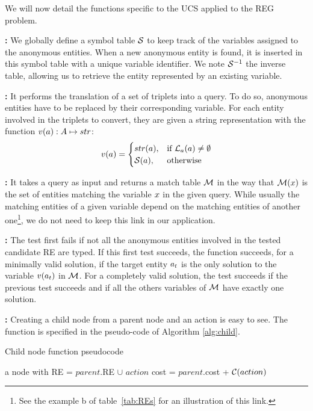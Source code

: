 We will now detail the functions specific to the UCS applied to the REG problem.

\textbf{\tovariable: }
We globally define a symbol table $\mathcal{S}$ to keep track of the variables assigned to the anonymous entities. When a new anonymous entity is found, it is inserted in this symbol table with a unique variable identifier. We note $\mathcal{S}^{-1}$ the inverse table, allowing us to retrieve the entity represented by an existing variable.

\textbf{\toquery: }
It performs the translation of a set of triplets into a \sparql{} query. To do so, anonymous entities have to be replaced by their corresponding variable. For each entity involved in the triplets to convert, they are given a string representation with the function $v(a): A \mapsto str$: 
\[ 
    v(a) = 
    \begin{cases}
        str(a),& \text{if } \mathcal{L}_a(a) \neq \emptyset\\
        \mathcal{S}(a),& \text{otherwise}
    \end{cases} 
\]

\textbf{\sparqlresult: }
It takes a \sparql{} query as input and returns a match table $\mathcal{M}$ in the way that $\mathcal{M}(x)$ is the set of entities matching the variable $x$ in the given query. While usually the matching entities of a given variable depend on the matching entities of another one\footnote{See the example b of table~\ref{tab:REs} for an illustration of this link.}, we do not need to keep this link in our application.

\textbf{\goaltest: }
The test first fails if not all the anonymous entities involved in the tested candidate RE are typed. If this first test succeeds, the function succeeds, for a minimally valid solution, if the target entity $a_t$ is the only solution to the variable $v(a_t)$ in $\mathcal{M}$. For a completely valid solution, the test succeeds if the previous test succeeds and if all the others variables of $\mathcal{M}$ have exactly one solution.

\textbf{\createchild: } 
Creating a child node from a parent node and an action is easy to see. The \createchild function is specified in the pseudo-code of Algorithm \ref{alg:child}. 

\begin{algorithm}[H]
\caption{\label{alg:child} Child node function pseudocode}
\begin{algorithmic}
    \State \Return a node with
    \State RE = $parent$.RE $\cup$ $action$
    \State cost = $parent$.cost + $\mathcal{C}(action)$
\EndFunction
\end{algorithmic}
\end{algorithm}


